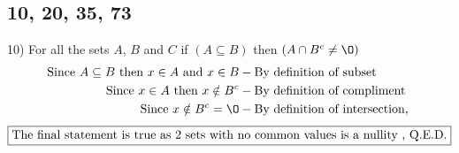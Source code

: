 \documentclass[11pt]{article}
\newcommand*{\mybox}[1]{\framebox{#1}}
\begin{document}
\subsection{10, 20, 35, 73}
\begin{flushleft}

10) For all the sets $A$, $B$ and $C$ if $(A\subseteq B)$ then $(A\cap B^c \neq \O)$ 
\vspace{-3mm}
\begin{align*}
\text{Since }A\subseteq B \text{ then }x\in A \text{ and }x\in B &- \text{By definition of subset}\\
\text{Since }x\in A \text{ then } x \notin B^c &- \text{By definition of compliment}\\
\text{Since }x \notin B^c  = \O &- \text{By definition of intersection, }
\end{align*}\vspace{-5mm}
$$\text{\mybox{The final statement is true as 2 sets with no common values is a nullity , Q.E.D.}}$$

\hrulefill


\end{flushleft}
\end{document}

